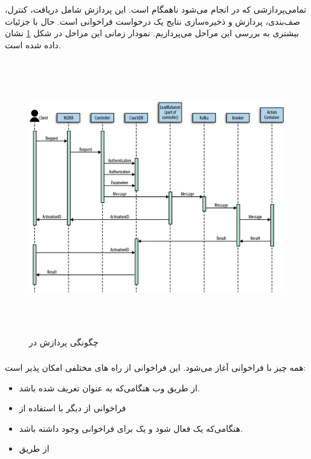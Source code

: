 \newpage

تمامی‌پردازشی که در  انجام می‌شود ناهمگام است. این پردازش شامل دریافت، کنترل، صف‌بندی، پردازش و ذخیره‌سازی نتایج یک درخواست فراخوانی  است. حال با جزئیات بیشتری به بررسی این مراحل می‌پردازیم. نمودار زمانی این مراحل در شکل \ref{action_invokation_timeline} نشان داده شده است.

\begin{figure}[!h]
	\centering
	\includegraphics[height=12cm]{images/action_invokation_timeline}
	\caption{چگونگی پردازش  در }
	\label{action_invokation_timeline}
\end{figure}

\subsubsection*{}

همه چیز با فراخوانی  آغاز می‌شود. این فراخوانی از راه های مختلفی امکان پذیر است:

\begin{itemize}

	\item از طریق وب هنگامی‌که  به عنوان  تعریف شده باشد.
	
	\item فراخوانی از  دیگر با استفاده از 
	
	\item هنگامی‌که یک  فعال شود و یک  برای فراخوانی  وجود داشته باشد.
	
	\item از طریق 
	
\end{itemize}


